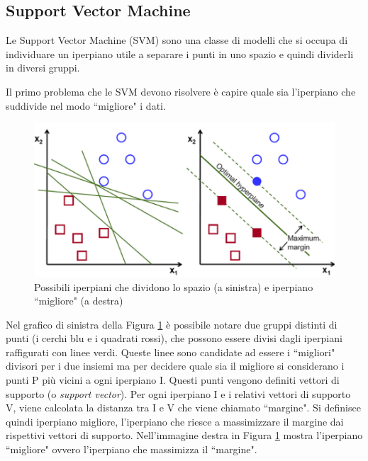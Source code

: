\documentclass[12pt,italian]{report}
\begin{document}
\subsection{Support Vector Machine}
Le Support Vector Machine (SVM) sono una classe di modelli che si occupa di individuare un iperpiano utile a separare i punti in uno spazio e quindi dividerli in diversi gruppi. 

Il primo problema che le SVM devono risolvere è capire quale sia l'iperpiano che suddivide nel modo ``migliore" i dati. 

\begin{figure}[h!]
	\center
	\includegraphics[scale=0.4]{../img/svc} %
	\caption{Possibili iperpiani che dividono lo spazio (a sinistra) e iperpiano ``migliore" (a destra)}
	\label{fig:svc}
\end{figure}

Nel grafico di sinistra della Figura \ref{fig:svc} è possibile notare due gruppi distinti di punti (i cerchi blu e i quadrati rossi), che possono essere divisi dagli iperpiani raffigurati con linee verdi. Queste linee sono candidate ad essere i ``migliori" divisori per i due insiemi ma per decidere quale sia il migliore si considerano i punti P più vicini a ogni iperpiano I. Questi punti vengono definiti vettori di supporto (o \emph{support vector}). Per ogni iperpiano I e i relativi vettori di supporto V, viene calcolata la distanza tra I e V che viene chiamato ``margine". Si definisce quindi iperpiano migliore, l'iperpiano che riesce a massimizzare il margine dai rispettivi vettori di supporto. Nell'immagine destra in Figura \ref{fig:svc} mostra l'iperpiano ``migliore" ovvero l'iperpiano che massimizza il ``margine".
\end{document}
